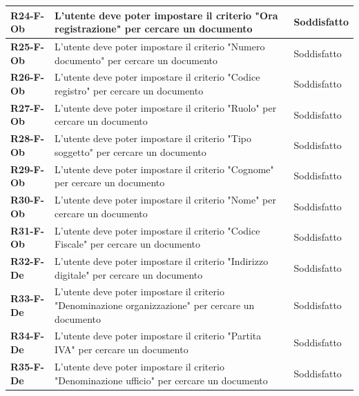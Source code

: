 \documentclass[a4paper,12pt]{article}
\begin{document}
{{{\begin{longtable}{|>{\centering\arraybackslash}m{}|>{\centering\arraybackslash}m{}|>{\centering\arraybackslash}m{}|}
                \hline
                \textbf{R24-F-Ob} & L'utente deve poter impostare il criterio "Ora registrazione" per cercare un documento & 
                Soddisfatto \\ 
                \hline
                \textbf{R25-F-Ob} & L'utente deve poter impostare il criterio "Numero documento" per cercare un documento & 
                Soddisfatto \\ 
                \hline
                \textbf{R26-F-Ob} & L'utente deve poter impostare il criterio "Codice registro" per cercare un documento & 
                Soddisfatto \\ 
                \hline
                \textbf{R27-F-Ob} & L'utente deve poter impostare il criterio "Ruolo" per cercare un documento & 
                Soddisfatto \\ 
                \hline
                \textbf{R28-F-Ob} & L'utente deve poter impostare il criterio "Tipo soggetto" per cercare un documento & 
                Soddisfatto \\ 
                \hline
                \textbf{R29-F-Ob} & L'utente deve poter impostare il criterio "Cognome" per cercare un documento & 
                Soddisfatto \\ 
                \hline
                \textbf{R30-F-Ob} & L'utente deve poter impostare il criterio "Nome" per cercare un documento & 
                Soddisfatto \\ 
                \hline
                \textbf{R31-F-Ob} & L'utente deve poter impostare il criterio "Codice Fiscale" per cercare un documento & 
                Soddisfatto \\ 
                \hline
                \textbf{R32-F-De} & L'utente deve poter impostare il criterio "Indirizzo digitale" per cercare un documento & 
                Soddisfatto \\ 
                \hline
                \textbf{R33-F-De} & L'utente deve poter impostare il criterio "Denominazione organizzazione" per cercare un documento & 
                Soddisfatto \\ 
                \hline
                \textbf{R34-F-De} & L'utente deve poter impostare il criterio "Partita IVA" per cercare un documento & 
                Soddisfatto \\ 
                \hline
                \textbf{R35-F-De} & L'utente deve poter impostare il criterio "Denominazione ufficio" per cercare un documento & 
                Soddisfatto \\ 

\end{longtable}}}}
\end{document}
